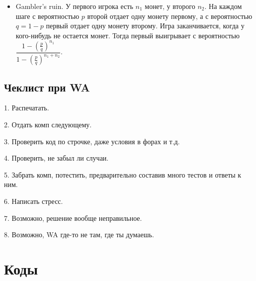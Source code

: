\documentclass[10pt, portrait,letterpaper]{article}
\begin{document}
\begin{itemize}
{\begin{center}
\end{center}
}
    
    \item Gambler's ruin. У первого игрока есть $n_1$ монет, у второго $n_2$. На каждом шаге с вероятностью $p$ второй отдает одну монету первому, а с вероятностью $q = 1 - p$ первый отдает одну монету второму. Игра заканчивается, когда у кого-нибудь не остается монет. Тогда первый выигрывает с вероятностью
$
\dfrac{1 - \left(\frac{p}{q}\right)^{n_1}}{1 - \left(\frac{p}{q}\right)^{n_1 + n_2}}.
$

\end{itemize}

\subsection{Чеклист при WA}

1. Распечатать.

2. Отдать комп следующему.

3. Проверить код по строчке, даже условия в форах и т.д.

4. Проверить, не забыл ли случаи.

5. Забрать комп, потестить, предварительно составив много тестов и ответы к ним.

6. Написать стресс.

7. Возможно, решение вообще неправильное.

8. Возможно, WA где-то не там, где ты думаешь.

\section{Коды}
\end{document}
